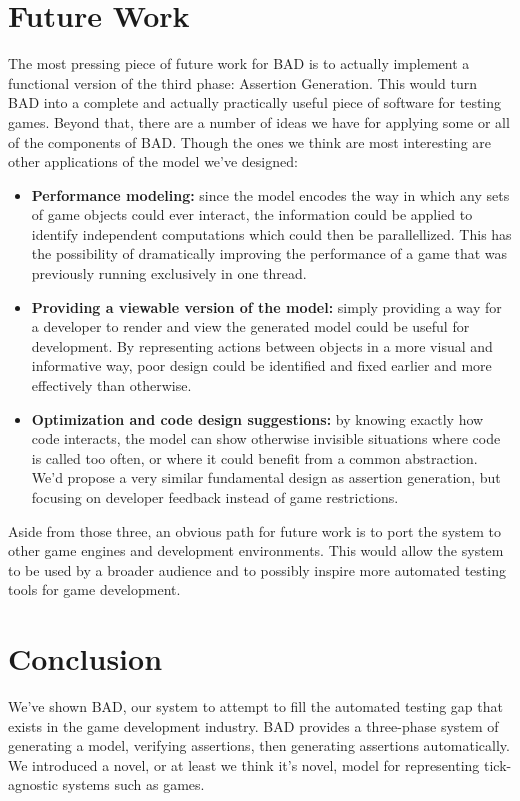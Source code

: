 \documentclass[letterpaper,twocolumn,10pt]{article}
\begin{document}
\section{Future Work}

The most pressing piece of future work for BAD is to actually implement a functional version of the third phase: Assertion Generation. This would turn BAD into a complete and actually practically useful piece of software for testing games. Beyond that, there are a number of ideas we have for applying some or all of the components of BAD. Though the ones we think are most interesting are other applications of the model we've designed:

\begin{itemize}
    \item{\textbf{Performance modeling:}} since the model encodes the way in which any sets of game objects could ever interact, the information could be applied to identify independent computations which could then be parallellized. This has the possibility of dramatically improving the performance of a game that was previously running exclusively in one thread.  
    \item {\textbf{Providing a viewable version of the model:}} simply providing a way for a developer to render and view the generated model could be useful for development. By representing actions between objects in a more visual and informative way, poor design could be identified and fixed earlier and more effectively than otherwise.
    \item{\textbf{Optimization and code design suggestions:}} by knowing exactly how code interacts, the model can show otherwise invisible situations where code is called too often, or where it could benefit from a common abstraction. We'd propose a very similar fundamental design as assertion generation, but focusing on developer feedback instead of game restrictions.
\end{itemize}

Aside from those three, an obvious path for future work is to port the system to other game engines and development environments. This would allow the system to be used by a broader audience and to possibly inspire more automated testing tools for game development.

\section{Conclusion}

We've shown BAD, our system to attempt to fill the automated testing gap that exists in the game development industry. BAD provides a three-phase system of generating a model, verifying assertions, then generating assertions automatically. We introduced a novel, or at least we think it's novel, model for representing tick-agnostic systems such as games.\\
\end{document}
